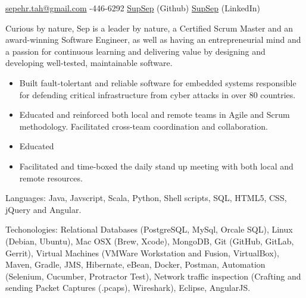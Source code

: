 \documentclass[10pt,a4paper]{article}
\begin{document}
\sloppy{}  %


\vspace{2em}

\noindent\href{mailto:sepehr.tah.at.gmail.dot.com}{sepehr.tah\mbox{}@\mbox{}gmail.com}\sbull
{}-446-6292\sbull
\href{https://github.com/supsep}{SupSep} (Github) \sbull
\href{http://www.linkedin.com/in/supsep}{SupSep} (LinkedIn) 


\spacedhrule{0.9em}{-0.4em}  %


Curious by nature, Sep is a leader by nature, a Certified Scrum Master and an 
award-winning Software Engineer, as well as having an entrepreneurial
mind and a passion for continuous learning  and delivering value
by designing and developing well-tested, maintainable software.

\noindent\begin{itemize}
\item Built fault-tolertant and reliable software for embedded systems responsible for defending critical infrastructure from cyber attacks in over 80 countries.
\item Educated and reinforced both local and remote teams in Agile and Scrum methodology. Facilitated
cross-team coordination and collaboration.
\item Educated
\item Facilitated and time-boxed the daily stand up meeting with both local and remote resources.
\end{itemize}


\vspace{2em}
\spacedhrule{0em}{-0.4em}

\inlineheadsection  %
  {Languages:}
  {Java, Javscript, Scala, Python, Shell scripts, SQL, HTML5, CSS, jQuery and Angular.}

\inlineheadsection 
  {Techonologies:}
  {Relational Databases (PostgreSQL, MySql, Orcale SQL), Linux (Debian, Ubuntu), Mac OSX (Brew, Xcode), MongoDB, Git (GitHub, GitLab, Gerrit), Virtual Machines (VMWare Workstation and Fusion, VirtualBox), Maven, Gradle, JMS, Hibernate, eBean, Docker, Postman, Automation (Selenium, Cucumber, Protractor Test), Network traffic inspection (Crafting and sending Packet Captures (.pcaps), Wireshark), Eclipse,  AngularJS.}
  
\end{document}
